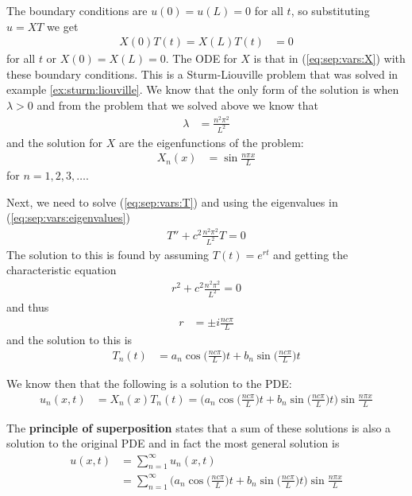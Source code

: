 The boundary conditions are $u(0) = u(L) = 0$ for all $t$, so substituting $u=XT$ we get 
%
\begin{align*}
X(0)T(t) = X(L) T(t) & = 0 
\end{align*}
for all $t$ or $X(0)=X(L)=0$.  The ODE for $X$ is that in (\ref{eq:sep:vars:X}) with these boundary conditions.  This is a Sturm-Liouville problem that was solved in example \ref{ex:sturm:liouville}.   We know that the only form of the solution is when $\lambda>0$ and from the problem that we solved above we know that 
% 
\begin{align} \label{eq:sep:vars:eigenvalues}
\lambda & = \frac{n^2 \pi^2}{L^2} 
\end{align} 
and the solution for $X$ are the eigenfunctions of the problem:
%
\begin{align*}
X_n(x) & = \sin \frac{n \pi x}{L}  
\end{align*}
for $n=1,2,3,\ldots$.  

Next, we need to solve (\ref{eq:sep:vars:T}) and using the eigenvalues in (\ref{eq:sep:vars:eigenvalues})
% 
\begin{align*}
T'' + c^2 \frac{n^2 \pi^2}{L^2} T = 0 
\end{align*}
The solution to this is found by assuming $T(t) = e^{r t}$ and getting the characteristic equation
% 
\begin{align*}
r^2 + c^2 \frac{n^2 \pi^2}{L^2} = 0 
\end{align*}
and thus 
%
\begin{align*}
r & = \pm i \frac{n c \pi}{L} 
\end{align*}
and the solution to this is
% 
\begin{align*}
T_n(t) & = a_n \cos \biggl( \frac{n c \pi }{L} \biggr) t + b_n \sin \biggl( \frac{n c \pi }{L} \biggr) t
\end{align*}

We know then that the following is a solution to the PDE:
% 
\begin{align*}
u_n(x,t) & = X_n(x) T_n(t) = \biggl( a_n \cos \biggl( \frac{n c \pi }{L} \biggr) t + b_n \sin \biggl( \frac{n c \pi }{L} \biggr) t \biggr) \sin \frac{n \pi x}{L}  
\end{align*}

The \textbf{principle of superposition} states that a sum of these solutions is also a solution to the original PDE and in fact the most general solution is 
% 
\begin{align*}
u(x,t) & = \sum_{n=1}^{\infty} u_n(x,t) \\
& = \sum_{n=1}^{\infty} \biggl( a_n \cos \biggl( \frac{n c \pi }{L} \biggr) t + b_n \sin \biggl( \frac{n c \pi }{L} \biggr) t \biggr) \sin \frac{n \pi x}{L}  
\end{align*}

